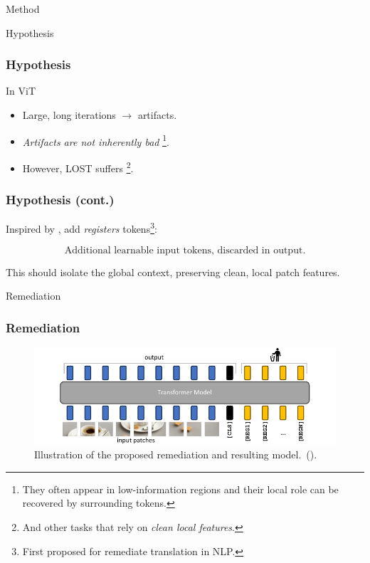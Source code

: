 \documentclass[aspectratio=169]{beamer}
\begin{document}
\begin{section}{Method}

\begin{subsection}{Hypothesis}

\begin{frame}
\frametitle{Hypothesis}
In ViT
\begin{itemize}
    \item Large, long iterations $\rightarrow$ artifacts.
    \item \emph{Artifacts are not inherently bad} \footnote{They often appear in low-information regions and their local role can be recovered by surrounding tokens.}.
    \item However, LOST suffers \footnote{And other tasks that rely on \emph{clean local features}.}.
\end{itemize}
\end{frame}

\begin{frame}
\frametitle{Hypothesis (cont.)}
Inspired by \cite{bulatovRecurrentMemoryTransformer2022}, add \emph{registers} tokens\footnote{First proposed for remediate translation in NLP.}:

$$
\boxed{\text{Additional learnable input tokens, discarded in output.}}
$$

\vspace{1em}
This should isolate the global context, preserving clean, local patch features.
\end{frame}

\end{subsection}

\begin{subsection}{Remediation}
\begin{frame}
\frametitle{Remediation}
\begin{figure}[t]
    \centering
    \includegraphics{resources/model.pdf} 
    \caption{
      Illustration of the proposed remediation and resulting model.~(\cite{darcetVisionTransformersNeed2024}).
    }  
    \vspace{-1em}
    \label{fig:model}
  \end{figure}
\end{frame}

\end{subsection}

\end{section}
\end{document}
